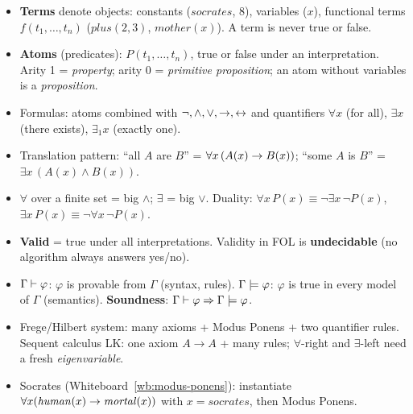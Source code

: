 \begin{nbsummary}
\begin{itemize}[nosep]
  \item \textbf{Terms} denote objects: constants ($\mathit{socrates}$, $8$), variables
        ($x$), functional terms $f(t_1,\ldots,t_n)$ ($\mathit{plus}(2,3)$,
        $\mathit{mother}(x)$). A term is never true or false.
  \item \textbf{Atoms} (predicates): $P(t_1,\ldots,t_n)$, true or false under an
        interpretation. Arity 1 = \emph{property}; arity 0 = \emph{primitive proposition};
        an atom without variables is a \emph{proposition}.
  \item Formulas: atoms combined with $\neg, \land, \lor, \rightarrow, \leftrightarrow$ and quantifiers
        $\forall x$ (for all), $\exists x$ (there exists), $\exists_1 x$ (exactly one).
  \item Translation pattern: ``all $A$ are $B$'' = $\forall x\,(A(x) \rightarrow B(x))$;
        ``some $A$ is $B$'' = $\exists x\,(A(x) \land B(x))$.
  \item $\forall$ over a finite set = big $\land$; $\exists$ = big $\lor$. Duality:
        $\forall x\,P(x) \equiv \neg\exists x\,\neg P(x)$,
        $\exists x\,P(x) \equiv \neg\forall x\,\neg P(x)$.
  \item \textbf{Valid} = true under all interpretations. Validity in FOL is
        \textbf{undecidable} (no algorithm always answers yes/no).
  \item $\Gamma \vdash \varphi$: $\varphi$ is provable from $\Gamma$ (syntax, rules).
        $\Gamma \models \varphi$: $\varphi$ is true in every model of $\Gamma$ (semantics).
        \textbf{Soundness}: $\Gamma \vdash \varphi \Rightarrow \Gamma \models \varphi$.
  \item Frege/Hilbert system: many axioms + Modus Ponens + two quantifier rules.
        Sequent calculus LK: one axiom $A \to A$ + many rules; $\forall$-right and
        $\exists$-left need a fresh \emph{eigenvariable}.
  \item Socrates (Whiteboard~\ref{wb:modus-ponens}): instantiate
        $\forall x(\mathit{human}(x) \rightarrow \mathit{mortal}(x))$ with $x = \mathit{socrates}$,
        then Modus Ponens.
\end{itemize}
\end{nbsummary}
